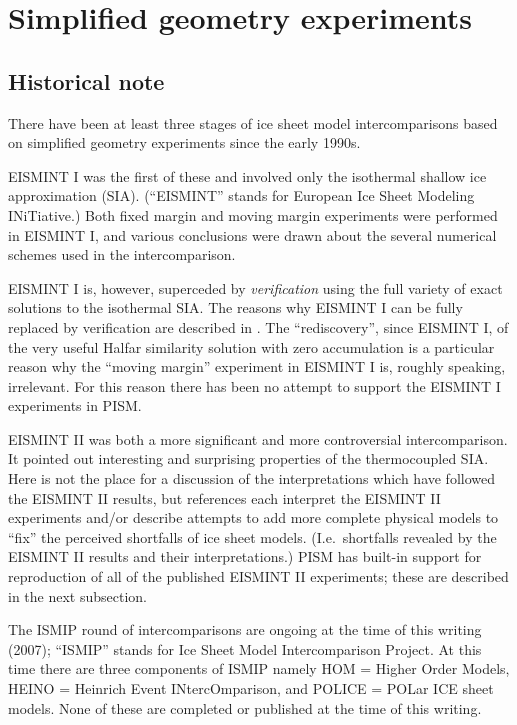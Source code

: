 \documentclass[11pt,final]{amsart}
\begin{document}
\clearpage\newpage
\section{Simplified geometry experiments}\label{sect:simp}

\subsection{Historical note}  There have been at least three stages of ice sheet model intercomparisons based on simplified geometry experiments since the early 1990s.

EISMINT I \cite{EISMINT96} was the first of these and involved only the isothermal shallow ice approximation (SIA).  (``EISMINT'' stands for European Ice Sheet Modeling INiTiative.)  Both fixed margin and moving margin experiments were performed in EISMINT I, and various conclusions were drawn about the several numerical schemes used in the intercomparison.  

EISMINT I is, however, superceded by \emph{verification} using the full variety of exact solutions to the isothermal SIA.  The reasons why EISMINT I can be fully replaced by verification are described in \cite{BLKCB}.  The ``rediscovery'', since EISMINT I, of the very useful Halfar similarity solution with zero accumulation \cite{Halfar83} is a particular reason why the ``moving margin'' experiment in EISMINT I is, roughly speaking, irrelevant.  For this reason there has been no attempt to support the EISMINT I experiments in PISM.

EISMINT II \cite{EISMINT00} was both a more significant and more controversial intercomparison.  It pointed out interesting and surprising properties of the thermocoupled SIA.  Here is not the place for a discussion of the interpretations which have followed the EISMINT II results, but references \cite{BBL,Hindmarsh04,Hindmarsh06,PayneBaldwin,SaitoEISMINT} each interpret the EISMINT II experiments and/or describe attempts to add more complete physical models to ``fix'' the perceived shortfalls of ice sheet models.   (I.e.~shortfalls revealed by the EISMINT II results and their interpretations.)  PISM has built-in support for reproduction of all of the published EISMINT II experiments; these are described in the next subsection.

The ISMIP round of intercomparisons are ongoing at the time of this writing (2007); ``ISMIP'' stands for Ice Sheet Model Intercomparison Project.  At this time there are three components of ISMIP namely HOM = Higher Order Models, HEINO = Heinrich Event INtercOmparison, and POLICE = POLar ICE sheet models.  None of these are completed or published at the time of this writing.
\end{document}
